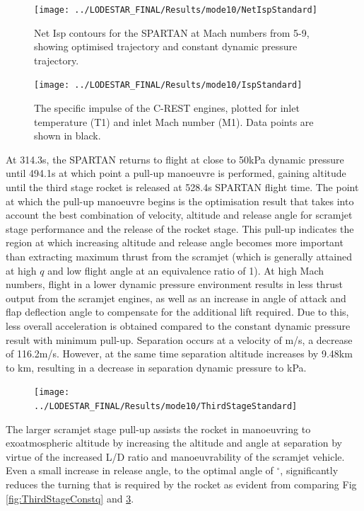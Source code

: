 \begin{figure}[ht!]
	\centering
	\texttt{[image: ../LODESTAR\_FINAL/Results/mode10/NetIspStandard]}
	\caption{Net Isp contours for the SPARTAN at Mach numbers from 5-9, showing optimised trajectory and constant dynamic pressure trajectory.}
	\label{fig:NetIspStandardNoReturn}
\end{figure}

\begin{figure}[ht!]
	\centering
	\texttt{[image: ../LODESTAR\_FINAL/Results/mode10/IspStandard]}
	\caption{The specific impulse of the C-REST engines, plotted for inlet temperature (T1) and inlet Mach number (M1). Data points are shown in black.}
	\label{fig:IspStandard}
\end{figure}


At 314.3s, the SPARTAN returns to flight at close to 50kPa dynamic pressure until 494.1s at which point a pull-up manoeuvre is performed, gaining altitude until the third stage rocket is released at 528.4s SPARTAN flight time. 
 The point at which the pull-up manoeuvre begins is the optimisation result that takes into account the best combination of velocity, altitude and release angle for scramjet stage performance and the release of the rocket stage. This pull-up indicates the region at which increasing altitude and release angle becomes more important than extracting maximum thrust from the scramjet (which is generally attained at high $q$ and low flight angle at an equivalence ratio of 1).
At high Mach numbers, flight in a lower dynamic pressure environment results in less thrust output from the scramjet engines, as well as an increase in angle of attack and flap deflection angle to compensate for the additional lift required. Due to this, less overall acceleration is obtained compared to the constant dynamic pressure result with minimum pull-up. Separation occurs at a velocity of \secondthirdSeparationvStandardNoReturn m/s, a decrease of 116.2m/s. However, at the same time separation altitude increases by 9.48km to \secondthirdSeparationAltqStandardNoReturn km, resulting in a decrease in separation dynamic pressure to \secondthirdSeparationqStandardNoReturn kPa. 
\begin{figure}[ht!]
	\centering
	\texttt{[image: ../LODESTAR\_FINAL/Results/mode10/ThirdStageStandard]}
	\caption{}
	\label{fig:ThirdStageStandardNoReturn}
\end{figure}
The larger scramjet stage pull-up assists the rocket in manoeuvring to exoatmospheric altitude by increasing the altitude and angle at separation by virtue of the increased L/D ratio and manoeuvrability of the scramjet vehicle. Even a small increase in release angle, to the optimal angle of \secondthirdSeparationgammaStandardNoReturn$^\circ$, significantly reduces the turning that is required by the rocket as evident from comparing Fig \ref{fig:ThirdStageConstq} and \ref{fig:ThirdStageStandardNoReturn}. 



